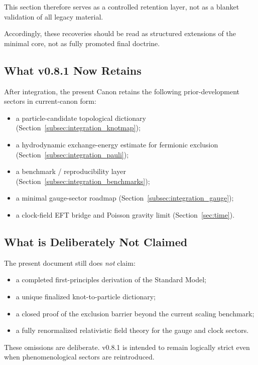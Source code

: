 \documentclass[11pt]{article}
\theoremstyle{definition}
\theoremstyle{plain}
\theoremstyle{remark}
\begin{document}
        This section therefore serves as a controlled retention layer, not as a blanket validation of all legacy material.

        Accordingly, these recoveries should be read as structured extensions of the minimal core, not as fully promoted final doctrine.

    \subsection{What v0.8.1 Now Retains}

        After integration, the present Canon retains the following prior-development sectors in current-canon form:
        \begin{itemize}
            \item a particle-candidate topological dictionary (Section~\ref{subsec:integration_knotmap});
            \item a hydrodynamic exchange-energy estimate for fermionic exclusion
            (Section~\ref{subsec:integration_pauli});
            \item a benchmark / reproducibility layer (Section~\ref{subsec:integration_benchmarks});
            \item a minimal gauge-sector roadmap (Section~\ref{subsec:integration_gauge});
            \item a clock-field EFT bridge and Poisson gravity limit (Section~\ref{sec:time}).
        \end{itemize}

    \subsection{What is Deliberately Not Claimed}

        The present document still does \emph{not} claim:
        \begin{itemize}
            \item a completed first-principles derivation of the Standard Model;
            \item a unique finalized knot-to-particle dictionary;
            \item a closed proof of the exclusion barrier beyond the current scaling benchmark;
            \item a fully renormalized relativistic field theory for the gauge and clock sectors.
        \end{itemize}

        These omissions are deliberate. v0.8.1 is intended to remain logically strict even when phenomenological
        sectors are reintroduced.
\end{document}
